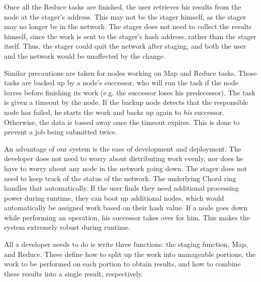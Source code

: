 
Once all the Reduce tasks are finished, the user retrieves his results from the node at the stager's address.  This may not be the stager himself, as the stager may no longer be in the network.  The stager does not need to collect the results himself, since the work is sent to the stager's hash address, rather than the stager itself.  Thus, the stager could quit the network after staging, and both the user and the network would be unaffected by the change. %

Similar precautions are taken for nodes working on Map and Reduce tasks.  Those tasks are backed up by a node's successor, who will run the task if the node leaves before finishing its work (e.g. the successor loses his predecessor).   The task is given a timeout by the node.  If the backup node detects that the responsible node has failed, he starts the work and backs up again to \emph{his} successor.  Otherwise, the data is tossed away once the timeout expires. This is done to prevent a job being submitted twice.

An advantage of our system is the ease of development and deployment.  The developer does not need to worry about distributing work evenly, nor does he have to worry about any node in the network going down.  The stager does not need to keep track of the status of the network.  The underlying Chord ring handles that automatically.  If the user finds they need additional processing power during runtime, they can boot up additional nodes, which would automatically be assigned work based on their hash value.   If a node goes down while performing an operation, his successor takes over for him.  This makes the system extremely robust during runtime.

All a developer needs to do is write three functions: the staging function, Map, and Reduce.  These define how to split up the work into manageable portions, the work to be performed on each portion to obtain results, and how to combine these results into a single result, respectively. 




